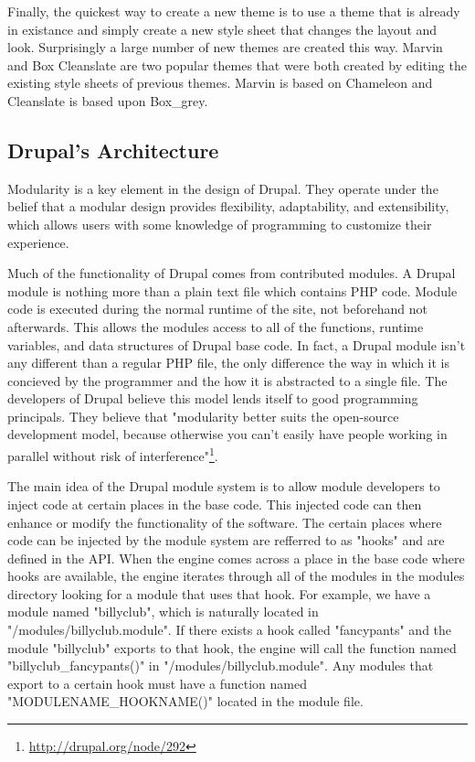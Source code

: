 \documentclass[a4paper,12pt]{report}
\begin{document}
Finally, the quickest way to create a new theme is to use a theme that is already in existance and simply create a new style sheet that changes the layout and look. 
Surprisingly a large number of new themes are created this way. 
Marvin and Box Cleanslate are two popular themes that were both created by editing the existing style sheets of previous themes. 
Marvin is based on Chameleon and Cleanslate is based upon Box\_grey.  


\subsection {Drupal's Architecture}
Modularity is a key element in the design of Drupal.
They operate under the belief that a modular design provides flexibility, adaptability, and extensibility, which allows users with some knowledge of programming to customize their experience.


Much of the functionality of Drupal comes from contributed modules. 
A Drupal module is nothing more than a plain text file which contains PHP code. 
Module code is executed during the normal runtime of the site, not beforehand not afterwards. 
This allows the modules access to all of the functions, runtime variables, and data structures of Drupal base code. 
In fact, a Drupal module isn't any different than a regular PHP file, the only difference the way in which it is concieved by the programmer and the how it is abstracted to a single file. 
The developers of Drupal believe this model lends itself to good programming principals. 
They believe that "modularity better suits the open-source development model, because otherwise you can't easily have people working in parallel without risk of interference"\footnote{\url{http://drupal.org/node/292}}. %


The main idea of the Drupal module system is to allow module developers to inject code at certain places in the base code. 
This injected code can then enhance or modify the functionality of the software. 
The certain places where code can be injected by the module system are refferred to as "hooks" and are defined in the API. 
When the engine comes across a place in the base code where hooks are available, the engine iterates through all of the modules in the modules directory looking for a module that uses that hook. 
For example, we have a module named "billyclub", which is naturally located in "/modules/billyclub.module". If there exists a hook called "fancypants" and the module "billyclub" exports to that hook, the engine will call the function named "billyclub_fancypants()" in "/modules/billyclub.module".
Any modules that export to a certain hook must have a function named "MODULENAME_HOOKNAME()" located in the module file. 
\end{document}
